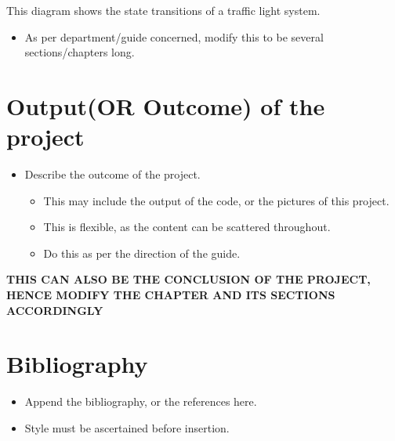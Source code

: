 \documentclass[
  12pt,
  a4paper,
  option1,
  option2]{report}
\providecommand{\tightlist}{%
  \setlength{\itemsep}{0pt}\setlength{\parskip}{0pt}}
\begin{document}
This diagram shows the state transitions of a traffic light system.

\begin{itemize}
\tightlist
\item
  As per department/guide concerned, modify this to be several
  sections/chapters long.
\end{itemize}

\chapter{Output(OR Outcome) of the project}\label{sec:Conclusion}

\begin{itemize}
\tightlist
\item
  Describe the outcome of the project.

  \begin{itemize}
  \tightlist
  \item
    This may include the output of the code, or the pictures of this
    project.
  \item
    This is flexible, as the content can be scattered throughout.
  \item
    Do this as per the direction of the guide.
  \end{itemize}
\end{itemize}

\textbf{THIS CAN ALSO BE THE CONCLUSION OF THE PROJECT, HENCE MODIFY THE
CHAPTER AND ITS SECTIONS ACCORDINGLY}

\chapter{Bibliography}\label{sec:bib}

\begin{itemize}
\tightlist
\item
  Append the bibliography, or the references here.
\item
  Style must be ascertained before insertion.
\end{itemize}
\end{document}
